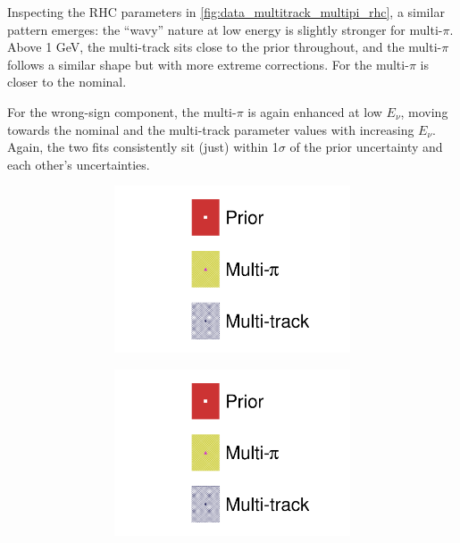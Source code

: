 Inspecting the \numubar RHC parameters in \autoref{fig:data_multitrack_multipi_rhc}, a similar pattern emerges: the ``wavy'' nature at low energy is slightly stronger for multi-$\pi$. Above 1 GeV, the multi-track sits close to the prior throughout, and the multi-$\pi$ follows a similar shape but with more extreme corrections. For \nuebar the multi-$\pi$ is closer to the nominal.

For the wrong-sign component, the multi-$\pi$ is again enhanced at low $E_\nu$, moving towards the nominal and the multi-track parameter values with increasing $E_\nu$. Again, the two fits consistently sit (just) within 1$\sigma$ of the prior uncertainty and each other's uncertainties.
\begin{figure}[h]
	\centering
		\begin{subfigure}[t]{\textwidth}
	\begin{subfigure}[t]{0.24\textwidth}
		\includegraphics[width=\textwidth,page=6, trim={0mm 0mm 0mm 9mm}, clip]{figures/mach3/2018/data/2018a_FixedCov_RedCov_Mpi_Data_merg_2018a_NewDetMatrix_OrderSwitched_Data2to8_ActualData_merge}
	\end{subfigure}
	\begin{subfigure}[t]{0.24\textwidth}
		\includegraphics[width=\textwidth,page=7, trim={0mm 0mm 0mm 9mm}, clip]{figures/mach3/2018/data/2018a_FixedCov_RedCov_Mpi_Data_merg_2018a_NewDetMatrix_OrderSwitched_Data2to8_ActualData_merge}

\end{subfigure}
\end{subfigure}
\end{figure}
